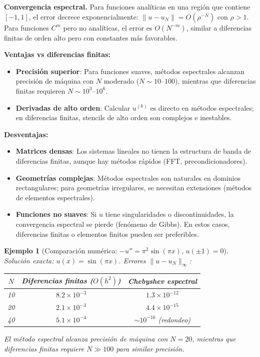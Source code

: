 \documentclass[a4paper,11pt]{report}
\newtheorem{example}[theorem]{Ejemplo}
\begin{document}
\textbf{Convergencia espectral.} Para funciones analíticas en una región que contiene $[-1,1]$, el error decrece exponencialmente: $\|u - u_N\| = O(\rho^{-N})$ con $\rho > 1$. Para funciones $C^m$ pero no analíticas, el error es $O(N^{-m})$, similar a diferencias finitas de orden alto pero con constantes más favorables.

\textbf{Ventajas vs diferencias finitas:}
\begin{itemize}
\item \textbf{Precisión superior}: Para funciones suaves, métodos espectrales alcanzan precisión de máquina con $N$ moderado ($N \sim 10$--$100$), mientras que diferencias finitas requieren $N \sim 10^3$--$10^6$.
\item \textbf{Derivadas de alto orden}: Calcular $u^{(k)}$ es directo en métodos espectrales; en diferencias finitas, stencils de alto orden son complejos e inestables.
\end{itemize}

\textbf{Desventajas:}
\begin{itemize}
\item \textbf{Matrices densas}: Los sistemas lineales no tienen la estructura de banda de diferencias finitas, aunque hay métodos rápidos (FFT, precondicionadores).
\item \textbf{Geometrías complejas}: Métodos espectrales son naturales en dominios rectangulares; para geometrías irregulares, se necesitan extensiones (métodos de elementos espectrales).
\item \textbf{Funciones no suaves}: Si $u$ tiene singularidades o discontinuidades, la convergencia espectral se pierde (fenómeno de Gibbs). En estos casos, diferencias finitas o elementos finitos pueden ser preferibles.
\end{itemize}

\begin{example}[Comparación numérica: $-u'' = \pi^2 \sin(\pi x)$, $u(\pm 1) = 0$]
Solución exacta: $u(x) = \sin(\pi x)$. Errores $\|u - u_N\|_\infty$:

\begin{center}
\begin{tabular}{|c|c|c|}
\hline
$N$ & Diferencias finitas ($O(h^2)$) & Chebyshev espectral \\
\hline
10 & $8.2 \times 10^{-3}$ & $1.3 \times 10^{-12}$ \\
20 & $2.1 \times 10^{-3}$ & $4.4 \times 10^{-15}$ \\
40 & $5.1 \times 10^{-4}$ & $\sim 10^{-16}$ (redondeo) \\
\hline
\end{tabular}
\end{center}

El método espectral alcanza precisión de máquina con $N = 20$, mientras que diferencias finitas requiere $N \gg 100$ para similar precisión.
\end{example}
\end{document}
